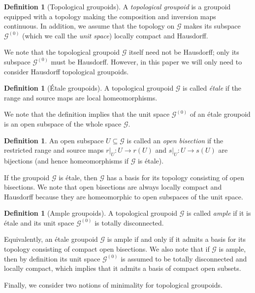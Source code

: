 \documentclass[10pt,a4paper]{amsart}
\numberwithin{equation}{section}
\numberwithin{figure}{section}
\theoremstyle{definition}
\newtheorem{defn}[thm]{Definition}
\newcommand{\cG}{\mathcal{G}}
\begin{document}
\begin{defn}[Topological groupoids]
\label{def:top-gropuoid}
A \emph{topological groupoid} is a groupoid equipped with a topology making the composition and inversion maps continuous. In addition, we assume that the topology on $\cG$ makes its subspace $\cG^{(0)}$ (which we call the \emph{unit space}) locally compact and Hausdorff.
\end{defn}

We note that the topological groupoid $\cG$ itself need not be Hausdorff; only its subspace $\cG^{(0)}$ must be Hausdorff. However, in this paper we will only need to consider Hausdorff topological groupoids.

\begin{defn}[{\'E}tale groupoids]
A topological groupoid $\mathcal{G}$ is called \emph{étale} if the range and source maps are local homeomorphisms.
\end{defn}

We note that the definition implies that the unit space $\cG^{(0)}$ of an étale groupoid is an open subspace of the whole space $\cG$.

\begin{defn}
An open subspace $U \subseteq \mathcal{G}$ is called an \emph{open bisection} if the restricted range and source maps $r|_U \colon U\to r(U)$ and $s|_U \colon U\to s(U)$ are bijections (and hence homeomorphisms if $\cG$ is étale).
\end{defn}

If the groupoid $\mathcal{G}$ is étale, then $\mathcal{G}$ has a basis for its topology consisting of open bisections. We note that open bisections are always locally compact and Hausdorff because they are homeomorphic to open subspaces of the unit space.

\begin{defn}[Ample groupoids]
\label{def:ample}
A topological groupoid $\mathcal{G}$ is called \emph{ample} if it is étale and its unit space $\mathcal{G}^{(0)}$ is totally disconnected.
\end{defn}

Equivalently, an étale groupoid $\cG$ is ample if and only if it admits a basis for its topology consisting of compact open bisections. We also note that if $\cG$ is ample, then by definition its unit space $\mathcal{G}^{(0)}$ is assumed to be totally disconnected and locally compact, which implies that it admits a basis of compact open subsets.

Finally, we consider two notions of minimality for topological groupoids.
\end{document}
